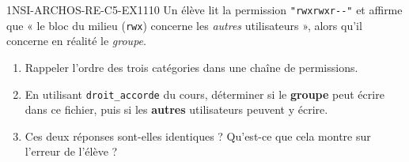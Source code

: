
\begin{exercice}{1NSI-ARCHOS-RE-C5-EX1}{1}{10}
Un élève lit la permission \lstinline{"rwxrwxr--"} et affirme que « le bloc du milieu
(\lstinline{rwx}) concerne les \emph{autres} utilisateurs », alors qu'il concerne en
réalité le \emph{groupe}.
\begin{enumerate}
  \item Rappeler l'ordre des trois catégories dans une chaîne de permissions.
  \item En utilisant \lstinline{droit_accorde} du cours, déterminer si le \textbf{groupe} peut écrire dans ce fichier, puis si les \textbf{autres} utilisateurs peuvent y écrire.
  \item Ces deux réponses sont-elles identiques ? Qu'est-ce que cela montre sur l'erreur de l'élève ?
\end{enumerate}
\end{exercice}


